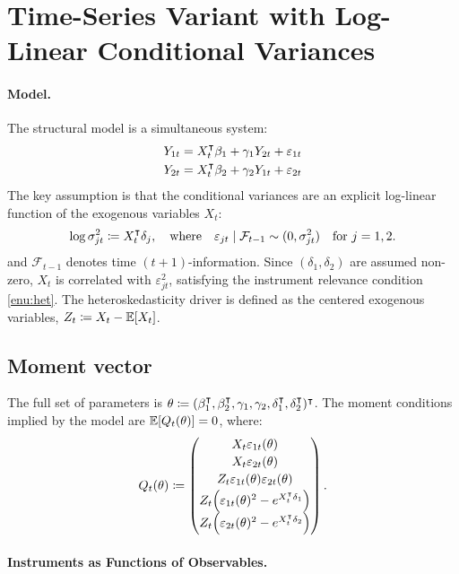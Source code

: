\section{Time-Series Variant with Log-Linear Conditional Variances}

\label{sec:timeseries}

\paragraph{Model.}

The structural model is a simultaneous system:
\begin{align*}
Y_{1t} & =X_{t}^{\intercal}\beta_{1}+\gamma_{1}Y_{2t}+\varepsilon_{1t}\\
Y_{2t} & =X_{t}^{\intercal}\beta_{2}+\gamma_{2}Y_{1t}+\varepsilon_{2t}
\end{align*}
The key assumption is that the conditional variances are an explicit
log-linear function of the exogenous variables $X_{t}$:
\[
\log\sigma_{jt}^{2}\coloneqq X_{t}^{\intercal}\delta_{j},\quad\text{where}\quad\varepsilon_{jt}\mid\mathcal{F}_{t-1}\sim(0,\sigma_{jt}^{2})\quad\text{for }j=1,2.
\]
and $\mathcal{F}_{t-1}$ denotes time $(t+1)$-information. Since
$(\delta_{1},\delta_{2})$ are assumed non-zero, $X_{t}$ is correlated
with $\varepsilon_{jt}^{2}$, satisfying the instrument relevance
condition \ref{enu:het}. The heteroskedasticity driver is defined
as the centered exogenous variables, $Z_{t}\coloneqq X_{t}-\mathbb{E}[X_{t}]$.

\subsection{Moment vector}

The full set of parameters is $\theta\coloneqq(\beta_{1}^{\intercal},\beta_{2}^{\intercal},\gamma_{1},\gamma_{2},\delta_{1}^{\intercal},\delta_{2}^{\intercal})^{\intercal}$.
The moment conditions implied by the model are $\mathbb{E}[Q_{t}(\theta)]=0$,
where:
\[
Q_{t}(\theta)\coloneqq\begin{pmatrix}X_{t}\varepsilon_{1t}(\theta)\\[2pt]
X_{t}\varepsilon_{2t}(\theta)\\[2pt]
Z_{t}\varepsilon_{1t}(\theta)\varepsilon_{2t}(\theta)\\[2pt]
Z_{t}\!\left(\varepsilon_{1t}(\theta)^{2}-e^{X_{t}^{\intercal}\delta_{1}}\right)\\[2pt]
Z_{t}\!\left(\varepsilon_{2t}(\theta)^{2}-e^{X_{t}^{\intercal}\delta_{2}}\right)
\end{pmatrix}.
\]


\paragraph{Instruments as Functions of Observables.}

